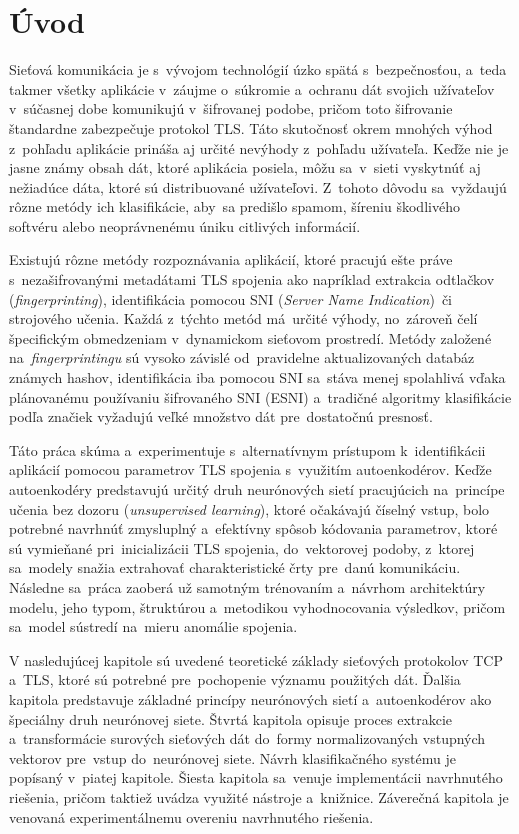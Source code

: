 \chapter{Úvod}

Sieťová komunikácia je s~vývojom technológií úzko spätá s~bezpečnosťou, a~teda takmer všetky aplikácie v~záujme o~súkromie a~ochranu dát svojich užívateľov v~súčasnej dobe komunikujú v~šifrovanej podobe, pričom toto šifrovanie štandardne zabezpečuje protokol TLS. Táto skutočnosť okrem mnohých výhod z~pohľadu aplikácie prináša aj určité nevýhody z~pohľadu užívateľa. Keďže nie je jasne známy obsah dát, ktoré aplikácia posiela, môžu sa~v~sieti vyskytnúť aj nežiadúce dáta, ktoré sú distribuované užívateľovi. Z~tohoto dôvodu sa~vyždaujú rôzne metódy ich klasifikácie, aby~sa predišlo spamom, šíreniu škodlivého softvéru alebo neoprávnenému úniku citlivých informácií.

Existujú rôzne metódy rozpoznávania aplikácií, ktoré pracujú ešte práve s~nezašifrovanými metadátami TLS spojenia ako napríklad extrakcia odtlačkov (\textit{fingerprinting}), identifikácia pomocou SNI (\textit{Server Name Indication})~či strojového učenia. Každá z~týchto metód má~určité výhody, no~zároveň čelí špecifickým obmedzeniam v~dynamickom sieťovom prostredí. Metódy založené na~\textit{fingerprintingu} sú vysoko závislé od~pravidelne aktualizovaných databáz známych hashov, identifikácia iba pomocou SNI sa~stáva menej spolahlivá vďaka plánovanému používaniu šifrovaného SNI (ESNI) a~tradičné algoritmy klasifikácie podľa značiek vyžadujú veľké množstvo dát pre~dostatočnú presnosť.

Táto práca skúma a~experimentuje s~alternatívnym prístupom k~identifikácii aplikácií pomocou parametrov TLS spojenia s~využitím autoenkodérov. Keďže autoenkodéry predstavujú určitý druh neurónových sietí pracujúcich na~princípe učenia bez dozoru (\textit{unsupervised learning}), ktoré očakávajú číselný vstup, bolo potrebné navrhnúť zmysluplný a~efektívny spôsob kódovania parametrov, ktoré sú vymieňané pri~inicializácii TLS spojenia, do~vektorovej podoby, z~ktorej sa~modely snažia extrahovať charakteristické črty pre~danú komunikáciu. Následne sa~práca zaoberá už samotným trénovaním a~návrhom architektúry modelu, jeho typom, štruktúrou a~metodikou vyhodnocovania výsledkov, pričom sa~model sústredí na~mieru anomálie spojenia. 

V nasledujúcej kapitole sú uvedené teoretické základy sieťových protokolov TCP a~TLS, ktoré sú potrebné pre~pochopenie významu použitých dát. Ďalšia kapitola predstavuje základné princípy neurónových sietí a~autoenkodérov ako špeciálny druh neurónovej siete. Štvrtá kapitola opisuje proces extrakcie a~transformácie surových sieťových dát do~formy normalizovaných vstupných vektorov pre~vstup do~neurónovej siete. Návrh klasifikačného systému je popísaný v~piatej kapitole. Šiesta kapitola sa~venuje implementácii navrhnutého riešenia, pričom taktiež uvádza využité nástroje a~knižnice. Záverečná kapitola je venovaná experimentálnemu overeniu navrhnutého riešenia.

